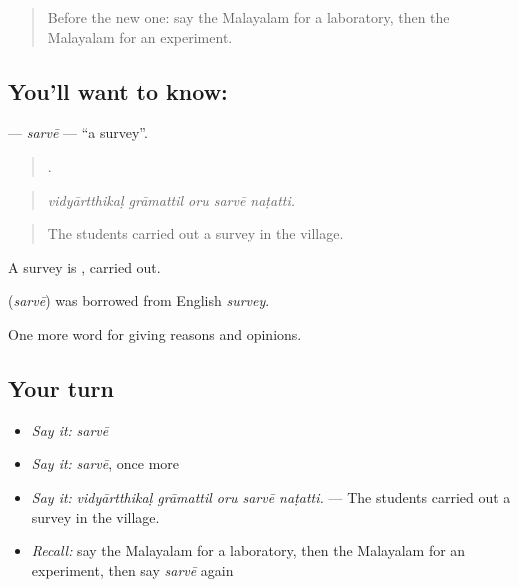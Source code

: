 \label{lesson:ML-C436-sarve}



\begin{quote}
Before the new one: say the Malayalam for a laboratory, then the Malayalam for an experiment.
\end{quote}

\subsection*{You'll want to know: }
\textbf{} — \emph{sarvē} — \textquotedblleft{}a survey\textquotedblright{}.

\begin{quote}
    .
\end{quote}

\begin{quote}
\emph{vidyārtthikaḷ grāmattil oru sarvē naṭatti.}
\end{quote}

\begin{quote}
The students carried out a survey in the village.
\end{quote}

A survey is , carried out.

\begin{cousinweb}
\textbf{} (\emph{sarvē}) was borrowed from English \emph{survey}.
\end{cousinweb}

\begin{grammarlens}[title={What you've built}]
One more word for giving reasons and opinions.
\end{grammarlens}

\subsection*{Your turn}
\begin{itemize}
\raggedright
  \item \emph{Say it:} \emph{sarvē}
  \item \emph{Say it:} \emph{sarvē}, once more
  \item \emph{Say it:} \emph{vidyārtthikaḷ grāmattil oru sarvē naṭatti.} — The students carried out a survey in the village.
  \item \emph{Recall:} say the Malayalam for a laboratory, then the Malayalam for an experiment, then say \emph{sarvē} again
\end{itemize}

